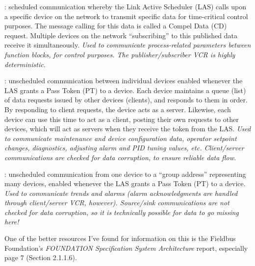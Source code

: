 
: scheduled communication whereby the Link Active Scheduler (LAS) calls upon a specific device on the network to transmit specific data for time-critical control purposes.  The message calling for this data is called a Compel Data (CD) request.  Multiple devices on the network ``subscribing'' to this published data receive it simultaneously.  {\it Used to communicate process-related parameters between function blocks, for control purposes.  The publisher/subscriber VCR is highly deterministic.}

\vskip 10pt

: unscheduled communication between individual devices enabled whenever the LAS grants a Pass Token (PT) to a device.  Each device maintains a queue (list) of data requests issued by other devices (clients), and responds to them in order.  By responding to client requests, the device acts as a server.  Likewise, each device can use this time to act as a client, posting their own requests to other devices, which will act as servers when they receive the token from the LAS.  {\it Used to communicate maintenance and device configuration data, operator setpoint changes, diagnostics, adjusting alarm and PID tuning values, etc.  Client/server communications are checked for data corruption, to ensure reliable data flow.}

\vskip 10pt

: unscheduled communication from one device to a ``group address'' representing many devices, enabled whenever the LAS grants a Pass Token (PT) to a device.  {\it Used to communicate trends and alarms (alarm acknowledgments are handled through client/server VCR, however).  Source/sink communications are not checked for data corruption, so it is technically possible for data to go missing here!} 

\vskip 10pt

One of the better resources I've found for information on this is the Fieldbus Foundation's {\it FOUNDATION Specification System Architecture} report, especially page 7 (Section 2.1.1.6).




